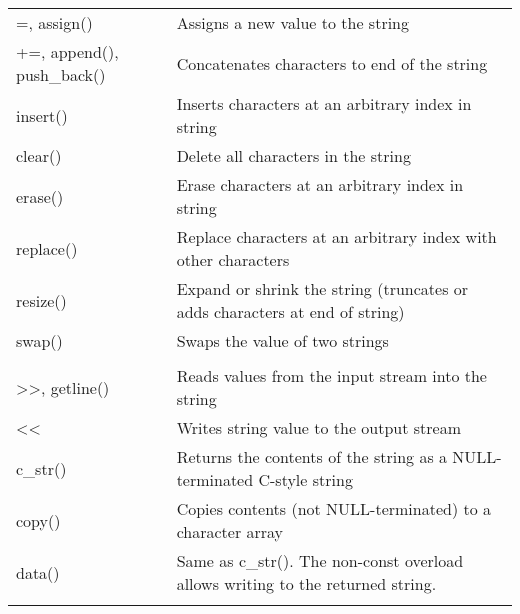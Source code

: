\documentclass[../../LearnCpp.tex]{subfiles}
\begin{document}
\begin{center}
\begin{tiny}
\begin{tabularx}{ 1\textwidth}{
                | >{\raggedright\arraybackslash}X
                | >{\raggedright\arraybackslash}X |
            }
            \hline
            =, assign()                & Assigns a new value to the string                                                   \\
            +=, append(), push\_back() & Concatenates characters to end of the string                                        \\
            insert()                   & Inserts characters at an arbitrary index in string                                  \\
            clear()                    & Delete all characters in the string                                                 \\
            erase()                    & Erase characters at an arbitrary index in string                                    \\
            replace()                  & Replace characters at an arbitrary index with other characters                      \\
            resize()                   & Expand or shrink the string (truncates or adds characters at end of string)         \\
            swap()                     & Swaps the value of two strings                                                      \\
            \hline
            \multicolumn{2}{|c|}{Input and Output}                                                                           \\
            \hline
            >>, getline()              & Reads values from the input stream into the string                                  \\
            <<                         & Writes string value to the output stream                                            \\
            c\_str()                   & Returns the contents of the string as a NULL-terminated C-style string              \\
            copy()                     & Copies contents (not NULL-terminated) to a character array                          \\
            data()                     & Same as c\_str(). The non-const overload allows writing to the returned string.     \\
            \hline
            \multicolumn{2}{|c|}{String comparison}                                                                          \\
            \hline

\end{tabularx}
\end{tiny}
\end{center}
\end{document}
